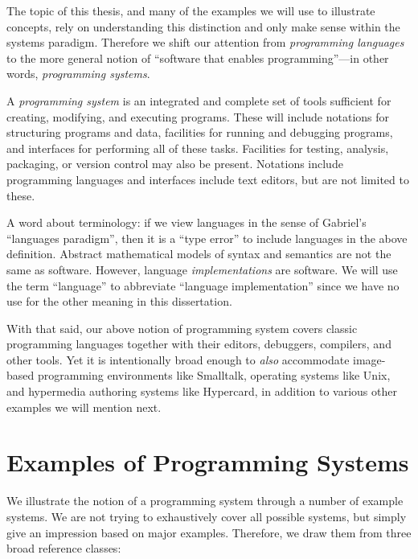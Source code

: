 The topic of this thesis, and many of the examples we will use to
illustrate concepts, rely on understanding this distinction and only
make sense within the systems paradigm. Therefore we shift our attention
from \emph{programming languages} to the more general notion of
``software that enables programming''---in other words,
\emph{programming systems}.

\begin{defn}
\label{def:programming-system}
A \emph{programming system} is an integrated and complete set of tools sufficient for creating, modifying, and executing programs. These will include notations for structuring programs and data, facilities for running and debugging programs, and interfaces for performing all of these tasks. Facilities for testing, analysis, packaging, or version control may also be present. Notations include programming languages and interfaces include text editors, but are not limited to these.
\end{defn}

A word about terminology: if we view languages in the sense of Gabriel's
``languages paradigm'', then it is a ``type error'' to include languages
in the above definition. Abstract mathematical models of syntax and
semantics are not the same as software. However, language
\emph{implementations} are software. We will use the term ``language''
to abbreviate ``language implementation'' since we have no use for the
other meaning in this dissertation.

With that said, our above notion of programming system covers classic
programming languages together with their editors, debuggers, compilers,
and other tools. Yet it is intentionally broad enough to \emph{also}
accommodate image-based programming environments like Smalltalk,
operating systems like Unix, and hypermedia authoring systems like
Hypercard, in addition to various other examples we will mention next.

\hypertarget{examples-of-programming-systems}{%
\section{Examples of Programming
Systems}\label{examples-of-programming-systems}}

We illustrate the notion of a programming system through a number of
example systems. We are not trying to exhaustively cover all possible
systems, but simply give an impression based on major examples.
Therefore, we draw them from three broad reference classes:

